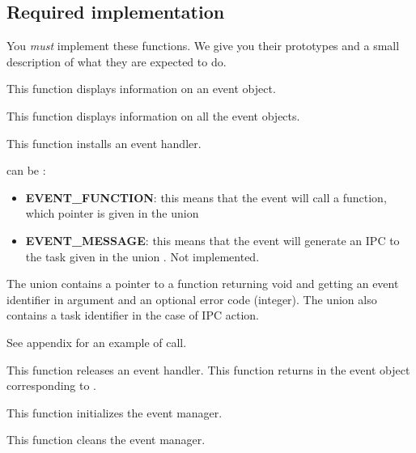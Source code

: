 \subsection*{Required implementation}
You \textit{must} implement these functions. We give you their prototypes
and a small description of what they are expected to do.

	 {
	   This function displays information on an event object.
	 }

	 {
	   This function displays information on all the event objects.
	 }

	 {
	   This function installs an event handler.

	    can be :
	   \begin{itemize}
	     \item
	       \textbf{EVENT\_FUNCTION}: this means that the event will
	       call a function, which pointer is given in the union
	     \item
	       \textbf{EVENT\_MESSAGE}: this means that the event will
	       generate an IPC to the task given in the union
	       . Not implemented.
	   \end{itemize}

	   The union  contains a pointer to a
	   function returning void and getting an event identifier in
	   argument and an optional error code (integer). The union
	   also contains a task identifier in the case of IPC action.

	   See appendix for an example of call.
	 }

	 {
	   This function releases an event handler.
	 }
\newpage
{}
	 {
	   This function returns in  the event object
	   corresponding to .
	 }

	 {
	   This function initializes the event manager.
	 }

	 {
	   This function cleans the event manager.
	 }


%
%

\newpage

